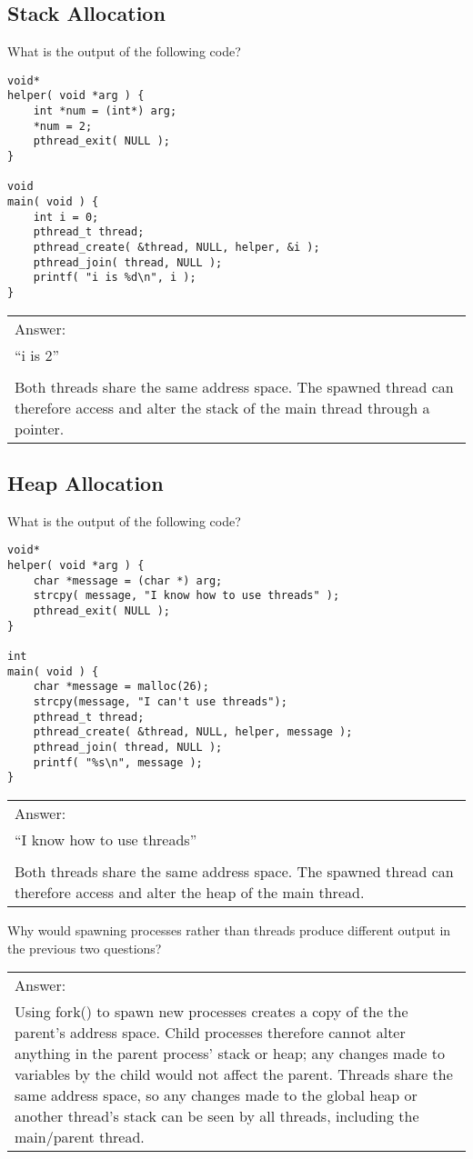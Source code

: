 \documentclass[11pt,a4paper]{article}
\newenvironment{answer}
   {\begin{center}
    \begin{tabular}{|p{0.95\textwidth}|}
    \hline
    }
    { 
    \\\hline
    \end{tabular} 
    \end{center}
    }
\begin{document}
\subsection{Stack Allocation}
What is the output of the following code?
\begin{shaded}
\begin{lstlisting}
void*
helper( void *arg ) {
	int *num = (int*) arg;
	*num = 2;
	pthread_exit( NULL );
}

void
main( void ) {
	int i = 0;
	pthread_t thread;
	pthread_create( &thread, NULL, helper, &i );
	pthread_join( thread, NULL );
	printf( "i is %d\n", i );
}
\end{lstlisting}
\end{shaded}
\begin{answer}
\color{red}Answer:\\
``i is 2''\\\\
Both threads share the same address space. The spawned thread can therefore access and alter the stack of the main thread through a pointer.
\end{answer}

\subsection{Heap Allocation}
What is the output of the following code?
\begin{shaded}
\begin{lstlisting}
void*
helper( void *arg ) {
	char *message = (char *) arg;
	strcpy( message, "I know how to use threads" );
	pthread_exit( NULL );
}

int
main( void ) {
	char *message = malloc(26);
	strcpy(message, "I can't use threads");
	pthread_t thread;
	pthread_create( &thread, NULL, helper, message );
	pthread_join( thread, NULL );
	printf( "%s\n", message );
}
\end{lstlisting}
\end{shaded}
\begin{answer}
\color{red}Answer:\\
``I know how to use threads''\\\\
Both threads share the same address space. The spawned thread can therefore access and alter the heap of the main thread.
\end{answer}
\noindent Why would spawning processes rather than threads produce different output in the previous two questions?
\begin{answer}
\color{red}Answer:\\
Using fork() to spawn new processes creates a copy of the the parent's address space. Child processes therefore cannot alter anything in the parent process' stack or heap; any changes made to variables by the child would not affect the parent. Threads share the same address space, so any changes made to the global heap or another thread's stack can be seen by all threads, including the main/parent thread.
\end{answer}
\end{document}
